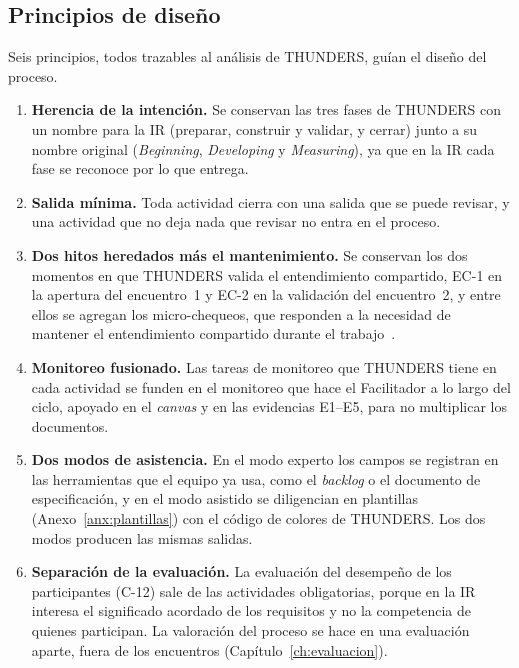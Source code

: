 \documentclass[12pt,letterpaper,oneside]{report}
\begin{document}
\subsection{Principios de diseño}
\label{sec:principios}
Seis principios, todos trazables al análisis de THUNDERS, guían el diseño del
proceso.
\begin{enumerate}
\item \textbf{Herencia de la intención.} Se conservan las tres fases de THUNDERS
  con un nombre para la IR (preparar, construir y validar, y cerrar) junto a su
  nombre original (\textit{Beginning}, \textit{Developing} y
  \textit{Measuring}), ya que en la IR cada fase se reconoce por lo que entrega.
\item \textbf{Salida mínima.} Toda actividad cierra con una salida que se
  puede revisar, y una actividad que no deja nada que revisar no entra en el
  proceso.
\item \textbf{Dos hitos heredados más el mantenimiento.} Se conservan los dos
  momentos en que THUNDERS valida el entendimiento compartido, EC-1 en la apertura del
  encuentro~1 y EC-2 en la validación del encuentro~2, y entre ellos se agregan
  los micro-chequeos, que responden a la necesidad de mantener el entendimiento compartido
  durante el trabajo~\cite{agredo2022exploratory}.
\item \textbf{Monitoreo fusionado.} Las tareas de monitoreo que THUNDERS tiene en
  cada actividad se funden en el monitoreo que hace el Facilitador a lo largo
  del ciclo, apoyado en el \textit{canvas} y en las evidencias E1--E5, para no
  multiplicar los documentos.
\item \textbf{Dos modos de asistencia.} En el modo experto los campos se
  registran en las herramientas que el equipo ya usa, como el \textit{backlog} o
  el documento de especificación, y en el modo asistido se diligencian
  en plantillas (Anexo~\ref{anx:plantillas}) con el código de
  colores de THUNDERS. Los dos modos producen las mismas salidas.
\item \textbf{Separación de la evaluación.} La evaluación del desempeño de
  los participantes (C-12) sale de las actividades obligatorias, porque en la IR
  interesa el significado acordado de los requisitos y no la competencia de quienes participan.
  La valoración del proceso se hace en una evaluación aparte, fuera de los
  encuentros (Capítulo~\ref{ch:evaluacion}).
\end{enumerate}
\end{document}
